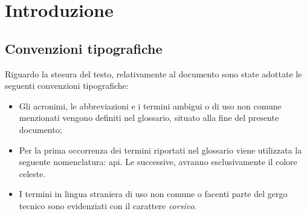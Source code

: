 
\chapter{Introduzione}
\label{cap:introduzione}




\section{Convenzioni tipografiche}







Riguardo la stesura del testo, relativamente al documento sono state adottate le seguenti convenzioni tipografiche:
\begin{itemize}
	\item Gli acronimi, le abbreviazioni e i termini ambigui o di uso non comune menzionati vengono definiti nel glossario, situato alla fine del presente documento;
	\item Per la prima occorrenza dei termini riportati nel glossario viene utilizzata la seguente nomenclatura: \gls{api}\gloss. Le successive, avranno esclusivamente il colore celeste.
	\item I termini in lingua straniera di uso non comune o facenti parte del gergo tecnico sono evidenziati con il carattere \emph{corsivo}.
\end{itemize}

